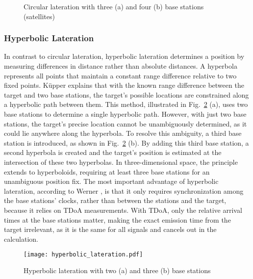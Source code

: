 \begin{figure}[htbp]%
    \centering
    \qquad
    \caption{Circular lateration with three (a) and four (b) base stations (satellites) \cite{gisgeography_trilateration}}%
    \label{fig:circular_lateration}%
\end{figure}

\subsubsection{Hyperbolic Lateration}
In contrast to circular lateration, hyperbolic lateration determines a position by measuring differences in distance rather than absolute distances. 
A hyperbola represents all points that maintain a constant range difference relative to two fixed points. 
K\"upper \cite{kupper2005location} explains that with the known range difference between the target and two base stations, the target's possible locations are constrained along a hyperbolic path between them. 
This method, illustrated in Fig.~\ref{fig:hyperbolic_lateration} (a), uses two base stations to determine a single hyperbolic path. 
However, with just two base stations, the target's precise location cannot be unambiguously determined, as it could lie anywhere along the hyperbola.
To resolve this ambiguity, a third base station is introduced, as shown in Fig.~\ref{fig:hyperbolic_lateration} (b). By adding this third base station, a second hyperbola is created and the target's position is estimated at the intersection of these two hyperbolas. 
In three-dimensional space, the principle extends to hyperboloids, requiring at least three base stations for an unambiguous position fix.
The most important advantage of hyperbolic lateration, according to Werner \cite{werner2014indoor}, is that it only requires synchronization among the base stations' clocks, rather than between the stations and the target, because it relies on \ac{TDoA} measurements. 
With \acs{TDoA}, only the relative arrival times at the base stations matter, making the exact emission time from the target irrelevant, as it is the same for all signals and cancels out in the calculation.

\begin{figure}[htbp]
    \centering
    \texttt{[image: hyperbolic\_lateration.pdf]}
    \caption{Hyperbolic lateration with two (a) and three (b) base stations \cite{kupper2005location}}
    \label{fig:hyperbolic_lateration}
\end{figure}

